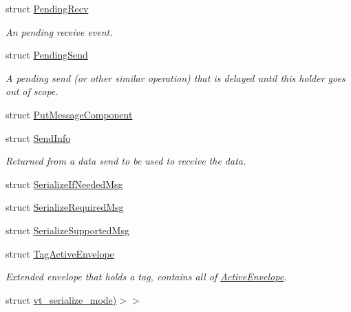 \begin{DoxyCompactItemize}
struct \hyperlink{structvt_1_1messaging_1_1_pending_recv}{Pending\+Recv}
\begin{DoxyCompactList}\small\item\em An pending receive event. \end{DoxyCompactList}\item 
struct \hyperlink{structvt_1_1messaging_1_1_pending_send}{Pending\+Send}
\begin{DoxyCompactList}\small\item\em A pending send (or other similar operation) that is delayed until this holder goes out of scope. \end{DoxyCompactList}\item 
struct \hyperlink{structvt_1_1messaging_1_1_put_message_component}{Put\+Message\+Component}
\item 
struct \hyperlink{structvt_1_1messaging_1_1_send_info}{Send\+Info}
\begin{DoxyCompactList}\small\item\em Returned from a data send to be used to receive the data. \end{DoxyCompactList}\item 
struct \hyperlink{structvt_1_1messaging_1_1_serialize_if_needed_msg}{Serialize\+If\+Needed\+Msg}
\item 
struct \hyperlink{structvt_1_1messaging_1_1_serialize_required_msg}{Serialize\+Required\+Msg}
\item 
struct \hyperlink{structvt_1_1messaging_1_1_serialize_supported_msg}{Serialize\+Supported\+Msg}
\item 
struct \hyperlink{structvt_1_1messaging_1_1_tag_active_envelope}{Tag\+Active\+Envelope}
\begin{DoxyCompactList}\small\item\em Extended envelope that holds a tag, contains all of {\ttfamily \hyperlink{structvt_1_1messaging_1_1_active_envelope}{Active\+Envelope}}. \end{DoxyCompactList}\item 
struct \hyperlink{structvt_1_1messaging_1_1msg__serialization__mode_3_01_message_t_00_01cxx14__void__t_3_01decltyp859af933e7cec0c00885df897a55208a}{vt\+\_\+serialize\+\_\+mode)$>$$>$}
\end{DoxyCompactItemize}
